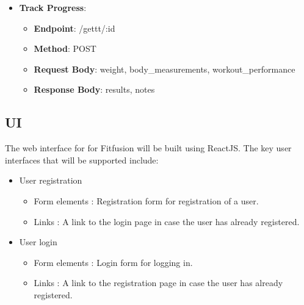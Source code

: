 \documentclass{article}
\begin{document}
\begin{itemize}
\item \textbf{Track Progress}:
\begin{itemize}
\item \textbf{Endpoint}: /gettt/:id
\item \textbf{Method}: POST
\item \textbf{Request Body}: {weight, body\_measurements, workout\_performance}
\item \textbf{Response Body}: {results, notes}
\end{itemize}




\end{itemize}

\subsection{UI}
The web interface for for Fitfusion will be built using ReactJS. The key user interfaces that will be supported include:

\begin{itemize}
\item User registration 
    \begin{itemize}
        \item Form elements : Registration form for registration of a user.
        \item Links : A link to the login page in case the user has already registered. 
    \end{itemize}
\item User login
    \begin{itemize}
        \item Form elements : Login form for logging in.
        \item Links : A link to the registration page in case the user has already registered. 
    \end{itemize}
\end{itemize}
\end{document}
